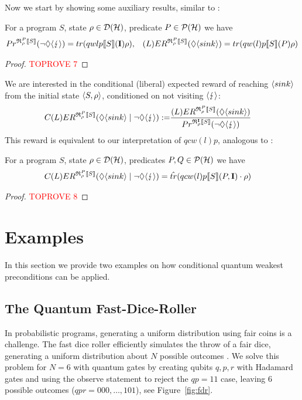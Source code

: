 \documentclass[a4paper,UKenglish,cleveref, autoref, thm-restate]{lipics-v2021}
\begin{document}
Now we start by showing some auxiliary results, similar to \cite[Lemma 5.5, 5.6]{conditioningProb}:
\begin{lemma}
    \label{lem:ErWpEqual}
    For a program $S$, state $\rho\in \mathcal{D}(\mathcal{H})$, predicate $P\in\mathcal{P}(\mathcal{H})$ we have
    \begin{align*}
        Pr^{\mathfrak{R}_{\rho}^{P}\llbracket S \rrbracket}(\neg \lozenge \langle \lightning \rangle) = tr(qwlp\llbracket S \rrbracket (\textbf{I}) \rho), &&
        (L)ER^{\mathfrak{R}_{\rho}^{P}\llbracket S \rrbracket} (\lozenge \langle sink \rangle)= tr(qw(l)p\llbracket S \rrbracket (P) \rho)
\end{align*}
\end{lemma}
\begin{proof}\textcolor{red}{TOPROVE 7}\end{proof}
We are interested in the conditional (liberal) expected reward of reaching $\langle sink \rangle$ from the initial state $\langle S , \rho \rangle$, conditioned on not visiting $\langle \lightning \rangle$:
\begin{align*}
    C(L)ER^{\mathfrak{R}_{\rho}^{P}\llbracket S \rrbracket} (\lozenge \langle sink \rangle \mid \neg \lozenge \langle \lightning \rangle):=& \frac{(L)ER^{\mathfrak{R}_{\rho}^{P}\llbracket S \rrbracket} (\lozenge \langle sink \rangle)}{Pr^{\mathfrak{R}_{\rho}^{\textbf{I}}\llbracket S \rrbracket}(\neg \lozenge \langle \lightning \rangle)}
\end{align*}
This reward is equivalent to our interpretation of $qcw(l)p$, analogous to \cite[Theorem 5.7]{conditioningProb}:
\begin{theorem} \label{th:correspondenceMcCqwp}
    For a program $S$, state $\rho\in \mathcal{D}(\mathcal{H})$, predicates $P,Q\in\mathcal{P}(\mathcal{H})$ we have
    \begin{align*}
        C(L)ER^{\mathfrak{R}_{\rho}^{P}\llbracket S \rrbracket} (\lozenge \langle sink \rangle \mid \neg \lozenge \langle \lightning \rangle) &= \hat{tr}( qcw(l)p\llbracket S \rrbracket (P,\textbf{I}) \cdot \rho)
\end{align*}
\end{theorem}
\begin{proof}\textcolor{red}{TOPROVE 8}\end{proof}







%
 \section{Examples}
\label{sec:example}
In this section we provide two examples on how conditional quantum weakest preconditions can be applied.
\subsection{The Quantum Fast-Dice-Roller}
In probabilistic programs, generating a uniform distribution using fair coins is a challenge. The fast dice roller efficiently simulates the throw of a fair dice, generating a uniform distribution about $N$ possible outcomes \cite{lumbroso}. We solve this problem for $N=6$ with quantum gates by creating qubits $q,p,r$ with Hadamard gates and using the observe statement to reject the $qp=11$ case, leaving $6$ possible outcomes ($qpr=000, \ldots , 101$), see Figure~\ref{fig:fdr}.
\end{document}
